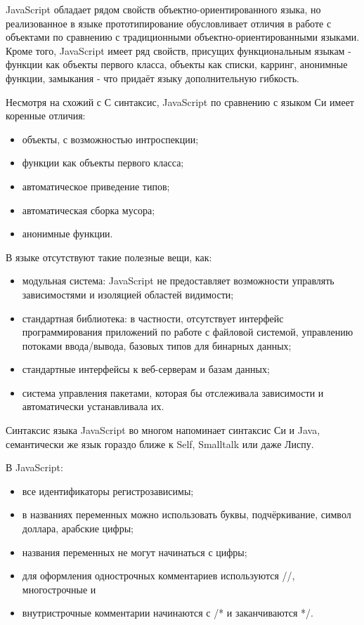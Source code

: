 JavaScript обладает рядом свойств объектно-ориентированного языка, но реализованное в языке прототипирование обусловливает отличия в работе с объектами по сравнению с традиционными объектно-ориентированными языками. Кроме того, JavaScript имеет ряд свойств, присущих функциональным языкам - функции как объекты первого класса, объекты как списки, карринг, анонимные функции, замыкания - что придаёт языку дополнительную гибкость.

Несмотря на схожий с С синтаксис, JavaScript по сравнению с языком Си имеет коренные отличия:

\begin{itemize}
  \item объекты, с возможностью интроспекции;
  \item функции как объекты первого класса;
  \item автоматическое приведение типов;
  \item автоматическая сборка мусора;
  \item анонимные функции.
\end{itemize}

В языке отсутствуют такие полезные вещи, как:

\begin{itemize}
  \item модульная система: JavaScript не предоставляет возможности управлять зависимостями и изоляцией областей видимости;
  \item стандартная библиотека: в частности, отсутствует интерфейс программирования приложений по работе с файловой системой, управлению потоками ввода/вывода, базовых типов для бинарных данных;
  \item стандартные интерфейсы к веб-серверам и базам данных;
  \item система управления пакетами, которая бы отслеживала зависимости и автоматически устанавливала их.
\end{itemize}

Синтаксис языка JavaScript во многом напоминает синтаксис Си и Java, семантически же язык гораздо ближе к Self, Smalltalk или даже Лиспу.

В JavaScript:

\begin{itemize}
  \item все идентификаторы регистрозависимы;
  \item в названиях переменных можно использовать буквы, подчёркивание, символ доллара, арабские цифры;
  \item названия переменных не могут начинаться с цифры;
  \item для оформления однострочных комментариев используются //, многострочные и \item внутристрочные комментарии начинаются с /* и заканчиваются */.
\end{itemize}

